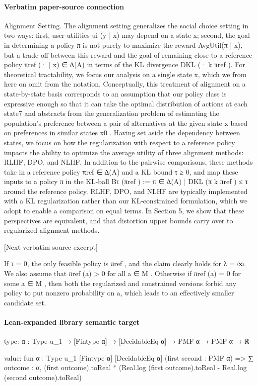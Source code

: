 \documentclass[10pt]{article}
\begin{document}
\paragraph{Verbatim paper-source connection}
\begin{ReviewVerbatim}
Alignment Setting. The alignment setting generalizes the social choice setting in two ways: first,
user utilities ui (y | x) may depend on a state x; second, the goal in determining a policy π is not
purely to maximize the reward AvgUtil(π | x), but a trade-off between this reward and the goal of
remaining close to a reference policy πref (· | x) ∈ ∆(A) in terms of the KL divergence DKL (· k πref ).
For theoretical tractability, we focus our analysis on a single state x, which we from here on omit
from the notation. Conceptually, this treatment of alignment on a state-by-state basis corresponds to
an assumption that our policy class is expressive enough so that it can take the optimal distribution of
actions at each state7 and abstracts from the generalization problem of estimating the population’s
preference between a pair of alternatives at the given state x based on preferences in similar states x0 .
Having set aside the dependency between states, we focus on how the regularization with respect
to a reference policy impacts the ability to optimize the average utility of three alignment methods:
RLHF, DPO, and NLHF. In addition to the pairwise comparisons, these methods take in a reference
policy πref ∈ ∆(A) and a KL bound τ ≥ 0, and map these inputs to a policy π in the KL-ball
Bτ (πref ) := {π ∈ ∆(A) | DKL (π k πref ) ≤ τ } around the reference policy. RLHF, DPO, and NLHF
are typically implemented with a KL regularization rather than our KL-constrained formulation,
which we adopt to enable a comparison on equal terms. In Section 5, we show that these perspectives
are equivalent, and that distortion upper bounds carry over to regularized alignment methods.

[Next verbatim source excerpt]

      If τ = 0, the only feasible policy is πref , and the claim clearly holds for λ = ∞. We also assume that
πref (a) > 0 for all a ∈ M . Otherwise if πref (a) = 0 for some a ∈ M , then both the regularized and constrained
versions forbid any policy to put nonzero probability on a, which leads to an effectively smaller candidate set.
\end{ReviewVerbatim}



\paragraph{Lean-expanded library semantic target}
\begin{ReviewVerbatim}
type:
{α : Type u_1} → [Fintype α] → [DecidableEq α] → PMF α → PMF α → ℝ

value:
fun {α : Type u_1} [Fintype α] [DecidableEq α] (first second : PMF α) =>
  ∑ outcome : α, (first outcome).toReal * (Real.log (first outcome).toReal - Real.log (second outcome).toReal)
\end{ReviewVerbatim}
\end{document}
